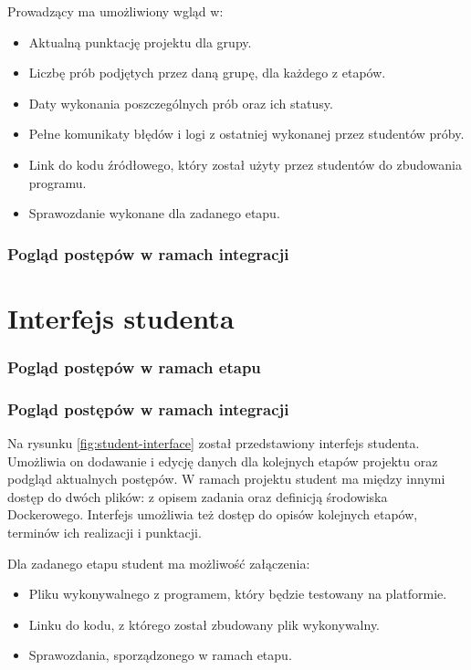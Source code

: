 Prowadzący ma umożliwiony wgląd w:
\begin {itemize}
    \item Aktualną punktację projektu dla grupy.
    \item Liczbę prób podjętych przez daną grupę, dla każdego z etapów.
    \item Daty wykonania poszczególnych prób oraz ich statusy.
    \item Pełne komunikaty błędów i logi z ostatniej wykonanej przez studentów próby.
    \item Link do kodu źródłowego, który został użyty przez studentów do zbudowania programu.
    \item Sprawozdanie wykonane dla zadanego etapu.
\end {itemize}


\subsubsection{Pogląd postępów w ramach integracji}




\section{Interfejs studenta}

\subsubsection{Pogląd postępów w ramach etapu}

\subsubsection{Pogląd postępów w ramach integracji}

Na rysunku \ref{fig:student-interface} został przedstawiony interfejs studenta.
Umożliwia on dodawanie i edycję danych dla kolejnych etapów projektu oraz podgląd aktualnych postępów.
W ramach projektu student ma między innymi dostęp do dwóch plików: z opisem zadania oraz definicją środowiska Dockerowego.
Interfejs umożliwia też dostęp do opisów kolejnych etapów, terminów ich realizacji i punktacji.

Dla zadanego etapu student ma możliwość załączenia:
\begin {itemize}
    \item Pliku wykonywalnego z programem, który będzie testowany na platformie.
    \item Linku do kodu, z którego został zbudowany plik wykonywalny.
    \item Sprawozdania, sporządzonego w ramach etapu.
\end {itemize}

